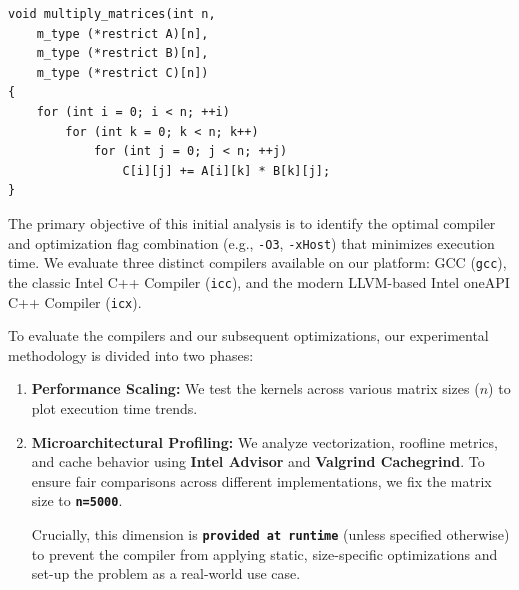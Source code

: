 \begin{lstlisting}[style=CStyle, caption={Naive matrix multiplication}, label={lst:naive_mm}]
void multiply_matrices(int n, 
    m_type (*restrict A)[n], 
    m_type (*restrict B)[n], 
    m_type (*restrict C)[n]) 
{
    for (int i = 0; i < n; ++i)
        for (int k = 0; k < n; k++)
            for (int j = 0; j < n; ++j)
                C[i][j] += A[i][k] * B[k][j];
}
\end{lstlisting}

The primary objective of this initial analysis is to identify the optimal compiler and optimization flag combination (e.g., \texttt{-O3}, \texttt{-xHost}) that minimizes execution time. We evaluate three distinct compilers available on our platform: GCC (\texttt{gcc}), the classic Intel C++ Compiler (\texttt{icc}), and the modern LLVM-based Intel oneAPI C++ Compiler (\texttt{icx}).

To evaluate the compilers and our subsequent optimizations, our experimental methodology is divided into two phases:

\begin{enumerate}
    \item \textbf{Performance Scaling:} We test the kernels across various matrix sizes ($n$) to plot execution time trends.
    \item \textbf{Microarchitectural Profiling:} We analyze vectorization, roofline metrics, and cache behavior using \textbf{Intel Advisor} and \textbf{Valgrind Cachegrind}. To ensure fair comparisons across different implementations, we fix the matrix size to \texttt{\textbf{n=5000}}.
    
    Crucially, this dimension is \texttt{\textbf{provided at runtime}} (unless specified otherwise) to prevent the compiler from applying static, size-specific optimizations and set-up  the problem as a real-world use case.
\end{enumerate}